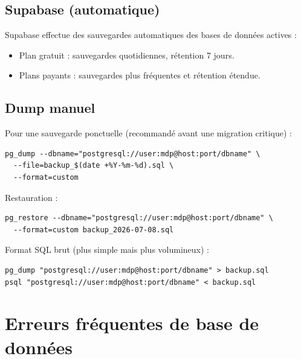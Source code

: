 \documentclass[12pt,a4paper]{report}
\begin{document}
\subsection{Supabase (automatique)}
Supabase effectue des sauvegardes automatiques des bases de données actives :
\begin{itemize}
    \item Plan gratuit : sauvegardes quotidiennes, rétention 7 jours.
    \item Plans payants : sauvegardes plus fréquentes et rétention étendue.
\end{itemize}

\subsection{Dump manuel}
Pour une sauvegarde ponctuelle (recommandé avant une migration critique) :
\begin{lstlisting}
pg_dump --dbname="postgresql://user:mdp@host:port/dbname" \
  --file=backup_$(date +%Y-%m-%d).sql \
  --format=custom
\end{lstlisting}

Restauration :
\begin{lstlisting}
pg_restore --dbname="postgresql://user:mdp@host:port/dbname" \
  --format=custom backup_2026-07-08.sql
\end{lstlisting}

Format SQL brut (plus simple mais plus volumineux) :
\begin{lstlisting}
pg_dump "postgresql://user:mdp@host:port/dbname" > backup.sql
psql "postgresql://user:mdp@host:port/dbname" < backup.sql
\end{lstlisting}

\section{Erreurs fréquentes de base de données}
\end{document}
